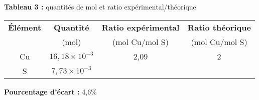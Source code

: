 \documentclass[11pt]{article}
\begin{document}
\noindent\textbf{Tableau 3 :} quantités de mol et ratio expérimental/théorique
\begin{center}
\begin{tabularx}{{\textwidth}}{@{}|c|c|C|C|@{}}
\hline
	\bf{Élément} & \bf{Quantité} & \bf{Ratio expérimental} & \bf{Ratio théorique}\\
	             & (mol)         & (mol Cu/mol S)          & (mol Cu/mol S)      \\
\hline
	Cu           & $16,18\times10^{-3}$ & 2,09 & 2\\
\hline
	S            & $ 7,73\times10^{-3}$ &  & \\
\hline
\end{tabularx}
\end{center}
\textbf{Pourcentage d'écart :} 4,6\%
\end{document}
